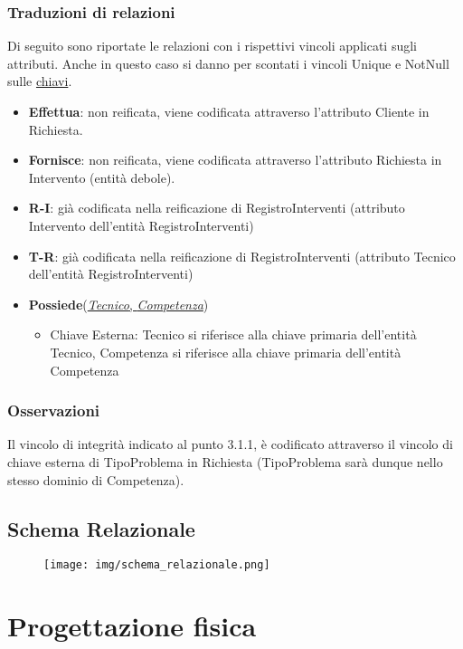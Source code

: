 \documentclass{article}
\begin{document}
\subsubsection{Traduzioni di relazioni}
Di seguito sono riportate le relazioni con i rispettivi vincoli applicati sugli attributi.
Anche in questo caso si danno per scontati i vincoli Unique e NotNull sulle \underline{chiavi}.

\begin{itemize}
    \item \textbf{Effettua}: non reificata, viene codificata attraverso l'attributo Cliente in Richiesta.
    \item \textbf{Fornisce}: non reificata, viene codificata attraverso l'attributo Richiesta in Intervento (entità debole).
    \item \textbf{R-I}: già codificata nella reificazione di RegistroInterventi (attributo Intervento dell'entità RegistroInterventi)
    \item \textbf{T-R}: già codificata nella reificazione di RegistroInterventi (attributo Tecnico dell'entità RegistroInterventi)
    \item \textbf{Possiede}(\underline{\textit{Tecnico}, \textit{Competenza}})
    \begin{itemize}
        \item Chiave Esterna: Tecnico si riferisce alla chiave primaria dell'entità Tecnico, Competenza si riferisce alla chiave primaria dell'entità Competenza
    \end{itemize}
\end{itemize}

\subsubsection{Osservazioni}
Il vincolo di integrità indicato al punto 3.1.1, è codificato attraverso il vincolo di chiave esterna di TipoProblema in Richiesta (TipoProblema sarà dunque nello stesso dominio di Competenza).

\subsection{Schema Relazionale}

\begin{figure}[h!]
    \centering
    \texttt{[image: img/schema\_relazionale.png]}
    \label{fig:ER_Schema3}
\end{figure}

\newpage
\section{Progettazione fisica}
\end{document}
